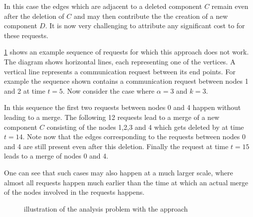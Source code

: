 \documentclass[a4paper,xcolor=dvipsnames, tikz, 12pt]{article}
\newcommand{\opt}{\text{O{\scriptsize PT}}}
\newcommand{\coreDel}{\text{C{\scriptsize ORE}-D{\scriptsize EL}}}
\newcommand{\request}[3]{\draw (axis cs:#3,#1) -- node[left]{} (axis cs:#3,#2);}
\theoremstyle{definition}
\begin{document}
	 In this case the edges which are adjacent to a deleted component $C$ remain even after the deletion of $C$ and may then contribute the the creation of a new component $D$. It is now very challenging to attribute any significant cost to \opt{} for these requests.
	 
	 \cref{exNewCrep} shows an example sequence of requests for which this approach does not work. The diagram shows horizontal lines, each representing one of the vertices. A vertical line represents a communication request between its end points. For example the sequence shown contains a communication request between nodes 1 and 2 at time $t=5$. Now consider the case where $\alpha=3$ and $k=3$.
	 
	 In this sequence the first two requests between nodes 0 and 4 happen without leading to a merge. The following 12 requests lead to a merge of a new component $C$ consisting of the nodes 1,2,3 and 4 which gets deleted by \coreDel{} at time $t=14$. Note now that the edges corresponding to the requests between nodes 0 and 4 are still present even after this deletion. Finally the request at time $t=15$ leads to a merge of nodes 0 and 4.
	 
	 One can see that such cases may also happen at a much larger scale, where almost all requests happen much earlier than the time at which an actual merge of the nodes involved in the requests happens.
	 
	 \begin{figure}
	 	\centering
	 	\caption{illustration of the analysis problem with the approach \coreDel{}}\label{exNewCrep}	
	 \end{figure}
	 
\end{document}
